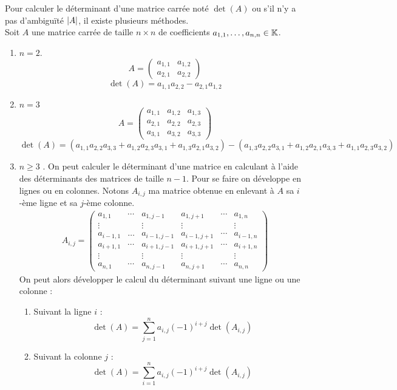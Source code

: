 Pour calculer le déterminant d'une matrice carrée noté $\det(A)$ ou s'il n'y a pas d'ambiguïté $\abs{A}$, il existe plusieurs méthodes.
	\\
    Soit $A$ une matrice carrée de taille $n \times n$ de coefficients $a_{1,1},\ldots,a_{n,n} \in \mathbb{K}$. 
    \begin{enumerate}
        \item $n = 2$. 
        \[ 
        A = 
        \begin{pmatrix}
            a_{1,1} & a_{1,2} \\
            a_{2,1} & a_{2,2}
        \end{pmatrix}
        \]
        \[ \det(A) = a_{1,1} a_{2,2} - a_{2,1} a_{1,2} \]
        \item $n = 3$
        \[
        A = 
        \begin{pmatrix}
            a_{1,1} & a_{1,2} & a_{1,3} \\
            a_{2,1} & a_{2,2} & a_{2,3} \\
            a_{3,1} & a_{3,2} & a_{3,3}
        \end{pmatrix}
        \]
        \[ \det(A) = (a_{1,1} a_{2,2} a_{3,3} + a_{1,2} a_{2,3} a_{3,1} + a_{1,3} a_{2,1} a_{3,2} ) - (a_{1,3} a_{2,2} a_{3,1} + a_{1,2} a_{2,1} a_{3,3} + a_{1,1} a_{2,3} a_{3,2}) \]
        \item $n \geq 3$ \cite{wikipedia_determinant}.
        On peut calculer le déterminant d'une matrice en calculant à l'aide des déterminants des matrices de taille $n-1$. Pour se faire on développe en lignes ou en colonnes.
        Notons $A_{i,j}$ ma matrice obtenue en enlevant à $A$ sa $i$-ème ligne et sa $j$-ème colonne.
        \begin{align*}
        	A_{i,j} = 
        	\begin{pmatrix}
        		a_{1,1} & \cdots & a_{1, j-1} & a_{1, j+1} & \cdots & a_{1,n} \\
        		\vdots & & \vdots & \vdots & & \vdots \\
        		a_{i-1, 1} & \ldots & a_{i-1, j-1} & a_{i-1, j+1} & \cdots & a_{i-1,n} \\
        		a_{i+1, 1} & \cdots & a_{i+1, j-1} & a_{i+1, j+1} & \cdots & a_{i+1, n} \\
        		\vdots & & \vdots & \vdots & & \vdots \\
        		a_{n,1} & \cdots & a_{n,j-1} & a_{n,j+1} & \cdots & a_{n,n}
        	\end{pmatrix}
        \end{align*}
        On peut alors développer le calcul du déterminant  suivant une ligne ou une colonne : 
        \begin{enumerate}
        	\item Suivant la ligne $i$ : 
        	\[ \det(A) = \sum_{j=1}^n a_{i,j} (-1)^{i+j} \det(A_{i,j}) \]
        	\item Suivant la colonne $j$ : 
        	\[ \det(A) = \sum_{i=1}^n a_{i,j} (-1)^{i+j} \det(A_{i,j}) \]
        \end{enumerate}
    \end{enumerate}

